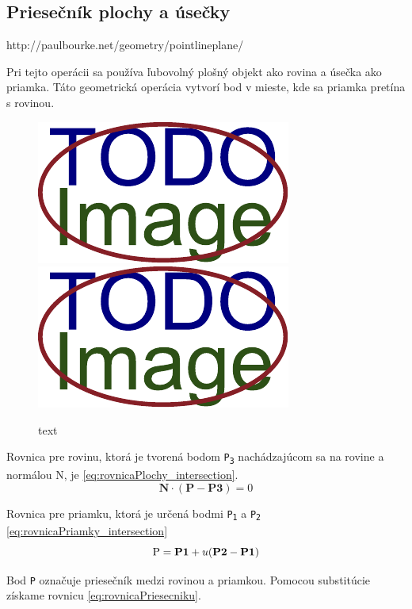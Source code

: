 \subsection{Priesečník plochy a úsečky}
http://paulbourke.net/geometry/pointlineplane/

Pri tejto operácii sa používa ľubovolný plošný objekt ako rovina a úsečka ako priamka. Táto geometrická operácia vytvorí bod v mieste, kde sa priamka pretína s rovinou. 


\begin{figure}[H]
	\centering
	\includegraphics[height=0.3\textwidth]{obrazky-figures/placeholder.pdf}
	\includegraphics[height=0.3\textwidth]{obrazky-figures/placeholder.pdf}
	\caption{text}
	\label{fig:1}
\end{figure}


Rovnica pre rovinu, ktorá je tvorená bodom \texttt{P\textsubscript{3}} nachádzajúcom sa na rovine a normálou N, je \ref{eq:rovnicaPlochy_intersection}. 
\begin{equation}
    \textbf{N} \cdot (\textbf{P} - \textbf{P3}) = 0
	\label{eq:rovnicaPlochy_intersection}
\end{equation}

Rovnica pre priamku, ktorá je určená bodmi \texttt{P\textsubscript{1}} a \texttt{P\textsubscript{2}}
\ref{eq:rovnicaPriamky_intersection}
\begin{equation}
	\textup{P}=\textbf{P1}+u (\textbf{P2}-\textbf{P1})
    \label{eq:rovnicaPriamky_intersection}
\end{equation}
	
Bod \texttt{P} označuje priesečník medzi rovinou a priamkou. Pomocou substitúcie získame rovnicu \ref{eq:rovnicaPriesecniku}.

